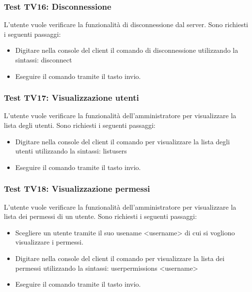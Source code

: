 \documentclass[a4paper]{article}
\begin{document}
		\subsubsection{Test TV16: Disconnessione}
		L'utente vuole verificare la funzionalità di disconnessione dal server.
		Sono richiesti i seguenti passaggi:
		\begin{itemize}
			\item Digitare nella console del client il comando di disconnessione utilizzando la sintassi: disconnect
			\item Eseguire il comando tramite il tasto invio.
		\end{itemize}
		
		\subsubsection{Test TV17:  Visualizzazione utenti}
		L'utente vuole verificare la funzionalità dell'amministratore per visualizzare la lista degli utenti.
		Sono richiesti i seguenti passaggi:
		\begin{itemize}
			\item Digitare nella console del client il comando per visualizzare la lista degli utenti utilizzando la sintassi: listusers
			\item Eseguire il comando tramite il tasto invio.
		\end{itemize}
		
		\subsubsection{Test TV18:  Visualizzazione permessi}
		L'utente vuole verificare la funzionalità dell'amministratore per visualizzare la lista dei permessi di un utente.
		Sono richiesti i seguenti passaggi:
		\begin{itemize}
			\item Scegliere un utente tramite il suo usename <username> di cui si vogliono visualizzare i permessi.
			\item Digitare nella console del client il comando per visualizzare la lista dei permessi utilizzando la sintassi: userpermissions <username>
			\item Eseguire il comando tramite il tasto invio.
		\end{itemize}
		
\end{document}
